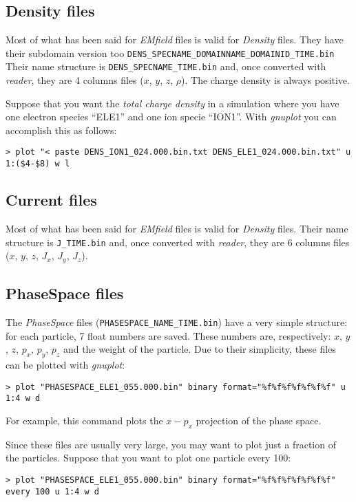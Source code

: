\documentclass[11pt,a4paper]{report}
\begin{document}
\subsection{Density files}
Most of what has been said for \emph{EMfield} files is valid for \emph{Density} files. They have their subdomain version too \verb+DENS_SPECNAME_DOMAINNAME_DOMAINID_TIME.bin+ Their name structure is \verb+DENS_SPECNAME_TIME.bin+ and, once converted with \emph{reader}, they are 4 columns files ($x$, $y$, $z$, $\rho$). The charge density is always positive.

Suppose that you want the \emph{total charge density} in a simulation where you have one electron species ``ELE1'' and one ion specie ``ION1''. With \emph{gnuplot} you can accomplish this as follows:
\begin{verbatim}
> plot "< paste DENS_ION1_024.000.bin.txt DENS_ELE1_024.000.bin.txt" u 1:($4-$8) w l
\end{verbatim}

\subsection{Current files}
Most of what has been said for \emph{EMfield} files is valid for \emph{Density} files. Their name structure is \verb+J_TIME.bin+ and, once converted with \emph{reader}, they are 6 columns files ($x$, $y$, $z$, $J_x$, $J_y$, $J_z$).

\subsection{PhaseSpace files}
The \emph{PhaseSpace} files (\verb+PHASESPACE_NAME_TIME.bin+) have a very simple structure: for each particle, 7 float numbers are saved. These numbers are, respectively: $x$, $y$, $z$, $p_x$, $p_y$, $p_z$ and the weight of the particle. Due to their simplicity, these files can be plotted with \emph{gnuplot}:
\begin{verbatim}
> plot "PHASESPACE_ELE1_055.000.bin" binary format="%f%f%f%f%f%f%f" u 1:4 w d
\end{verbatim}
For example, this command plots the $x-p_x$ projection of the phase space.

Since these files are usually very large, you may want to plot just a fraction of the particles. Suppose that you want to plot one particle every 100:
\begin{verbatim}
> plot "PHASESPACE_ELE1_055.000.bin" binary format="%f%f%f%f%f%f%f" every 100 u 1:4 w d
\end{verbatim}
\end{document}
